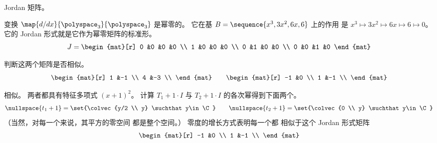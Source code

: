 \begin{exercises}
    Jordan 矩阵。
    \begin{answer}
      变换 $\map{d/dx}{\polyspace_3}{\polyspace_3}$
      是幂零的。
      它在基 \( B=\sequence{x^3,3x^2,6x,6} \) 上的作用
      是 $x^3\mapsto 3x^2\mapsto 6x\mapsto 6\mapsto 0$。
      它的 Jordan 形式就是它作为幂零矩阵的标准形。
      \begin{equation*}
         J=
         \begin{mat}[r]
           0  &0  &0  &0  \\
           1  &0  &0  &0  \\
           0  &1  &0  &0  \\
           0  &0  &1  &0
         \end{mat}
      \end{equation*}
    \end{answer}
   \recommended \item 
      判断这两个矩阵是否相似。
      \begin{equation*}
         \begin{mat}[r]
            1  &-1 \\
            4  &-3 \\
         \end{mat}
         \qquad
         \begin{mat}[r]
           -1  &0  \\
            1  &-1 \\
         \end{mat}
      \end{equation*}
      \begin{answer}
        相似。
        两者都具有特征多项式 $(x+1)^2$。
        计算 $T_1+1\cdot I$ 与
        $T_2+1\cdot I$ 的各次幂得到下面两个。
        \begin{equation*}
          \nullspace{t_1+1}=\set{\colvec{y/2 \\ y} \suchthat y\in\C}
          \qquad
          \nullspace{t_2+1}=\set{\colvec{0 \\ y} \suchthat y\in\C}
        \end{equation*}
        （当然，对每一个来说，其平方的零空间
        都是整个空间。）
        零度的增长方式表明每一个都
        相似于这个 Jordan 形式矩阵
        \begin{equation*}
           \begin{mat}[r]
             -1  &0  \\
              1  &-1 \\
           \end{mat}

\end{equation*}
\end{answer}
\end{exercises}
